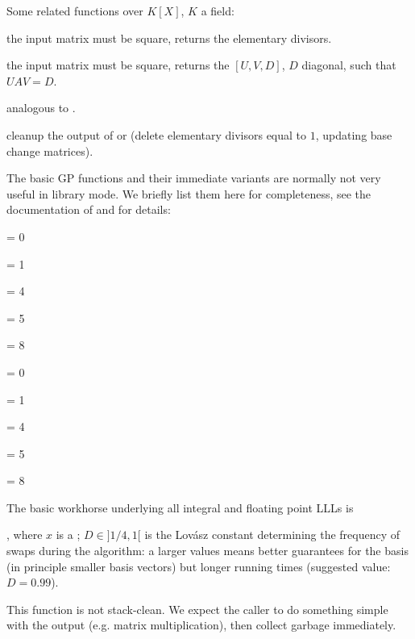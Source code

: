 \noindent Some related functions over $K[X]$, $K$ a field:

 the input matrix must be square, returns the
elementary divisors.

 the input matrix must be square, returns the
$[U,V,D]$, $D$ diagonal, such that $UAV = D$.

 analogous to .

 cleanup the output of  or
 (delete elementary divisors equal to $1$, updating base
change matrices).


The basic GP functions and their immediate variants are normally not very
useful in library mode. We briefly list them here for completeness, see the
documentation of  and  for details:

\item {}

 \fl = 0

 \fl = 1

 \fl = 4

 \fl = 5

 \fl = 8

\item {}

 \fl = 0

 \fl = 1

 \fl = 4

 \fl = 5

 \fl = 8

\smallskip

The basic workhorse underlying all integral and floating point LLLs is

, where $x$ is a ;
$D \in ]1/4,1[$ is the Lov\'{a}sz constant determining the frequency of
swaps during the algorithm: a larger values means better guarantees for
the basis (in principle smaller basis vectors) but longer running times
(suggested value: $D = 0.99$).

 This function is not stack-clean. We expect
the caller to do something simple with the output (e.g. matrix
multiplication), then collect garbage immediately.

